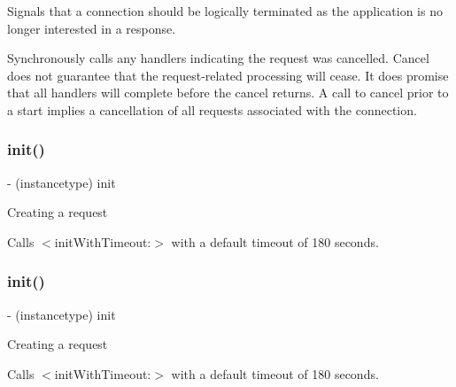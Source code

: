 Signals that a connection should be logically terminated as the application is no longer interested in a response.

Synchronously calls any handlers indicating the request was cancelled. Cancel does not guarantee that the request-\/related processing will cease. It does promise that all handlers will complete before the cancel returns. A call to cancel prior to a start implies a cancellation of all requests associated with the connection. \mbox{\label{interfaceFBRequestConnection_aaa4ab7062e1647fa4d29964052372363}} 
\subsubsection{\texorpdfstring{init()}{init()}\hspace{0.1cm}{\footnotesize\ttfamily [1/5]}}
{\footnotesize\ttfamily -\/ (instancetype) init \begin{DoxyParamCaption}{ }\end{DoxyParamCaption}}

Creating a request

Calls $<$init\+With\+Timeout\+:$>$ with a default timeout of 180 seconds. \mbox{\label{interfaceFBRequestConnection_aaa4ab7062e1647fa4d29964052372363}} 
\subsubsection{\texorpdfstring{init()}{init()}\hspace{0.1cm}{\footnotesize\ttfamily [2/5]}}
{\footnotesize\ttfamily -\/ (instancetype) init \begin{DoxyParamCaption}{ }\end{DoxyParamCaption}}

Creating a request

Calls $<$init\+With\+Timeout\+:$>$ with a default timeout of 180 seconds. \mbox{\label{interfaceFBRequestConnection_aaa4ab7062e1647fa4d29964052372363}} 
